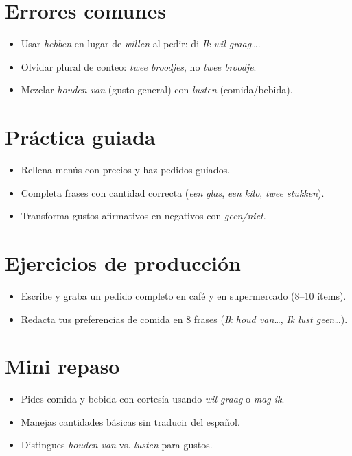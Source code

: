 \section{Errores comunes}
\begin{itemize}[leftmargin=*]
	\item Usar \textit{hebben} en lugar de \textit{willen} al pedir: di \textit{Ik wil graag\ldots{}}.
	\item Olvidar plural de conteo: \textit{twee broodjes}, no \textit{twee broodje}.
	\item Mezclar \textit{houden van} (gusto general) con \textit{lusten} (comida/bebida).
\end{itemize}

\section{Práctica guiada}
\begin{itemize}[leftmargin=*]
	\item Rellena menús con precios y haz pedidos guiados.
	\item Completa frases con cantidad correcta (\textit{een glas}, \textit{een kilo}, \textit{twee stukken}).
	\item Transforma gustos afirmativos en negativos con \textit{geen/niet}.
\end{itemize}

\section{Ejercicios de producción}
\begin{itemize}[leftmargin=*]
	\item Escribe y graba un pedido completo en café y en supermercado (8–10 ítems).
	\item Redacta tus preferencias de comida en 8 frases (\textit{Ik houd van\ldots{}}, \textit{Ik lust geen\ldots{}}).
\end{itemize}

\section{Mini repaso}
\begin{itemize}[leftmargin=*]
	\item Pides comida y bebida con cortesía usando \textit{wil graag} o \textit{mag ik}.
	\item Manejas cantidades básicas sin traducir del español.
	\item Distingues \textit{houden van} vs. \textit{lusten} para gustos.
\end{itemize}

